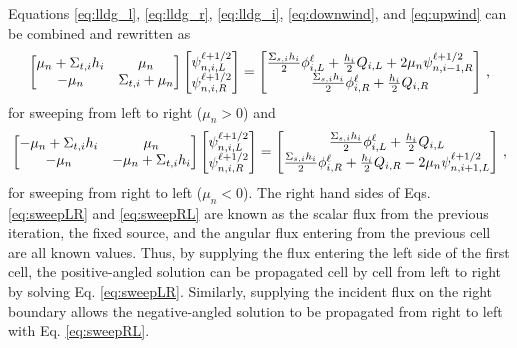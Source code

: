 Equations \ref{eq:lldg_l}, \ref{eq:lldg_r}, \ref{eq:lldg_i}, \ref{eq:downwind}, and \ref{eq:upwind} can be combined and rewritten as 
	\begin{equation} \label{eq:sweepLR}
		\left[\begin{matrix}
			\mu_n + \Sigma_{t,i} h_i & \mu_n  \\ 
			-\mu_n & \Sigma_{t,i} + \mu_n \\ 
		\end{matrix}\right]
		\left[\begin{matrix}
			\psi_{n,i,L}^{\ell+1/2} \\ \psi_{n,i,R}^{\ell+1/2}
		\end{matrix}\right]
		= \left[\begin{matrix}
			\frac{\Sigma_{s,i}h_i}{2} \phi_{i,L}^\ell + \frac{h_i}{2} Q_{i,L} + 2\mu_n \psi_{n,i-1,R}^{\ell+1/2} \\
			\frac{\Sigma_{s,i}h_i}{2} \phi_{i,R}^\ell + \frac{h_i}{2} Q_{i,R} 
		\end{matrix}\right] \,, 
	\end{equation}
for sweeping from left to right ($\mu_n > 0$) and 
	\begin{equation} \label{eq:sweepRL}
		\left[\begin{matrix} 
			-\mu_n + \Sigma_{t,i}h_i & \mu_n \\ 
			-\mu_n & -\mu_n + \Sigma_{t,i}h_i \\ 
		\end{matrix} \right]
		\left[\begin{matrix}
			\psi_{n,i,L}^{\ell+1/2} \\ \psi_{n,i,R}^{\ell+1/2}
		\end{matrix} \right]
		= \left[\begin{matrix}
			\frac{\Sigma_{s,i}h_i}{2} \phi_{i,L}^\ell + \frac{h_i}{2} Q_{i,L} \\ 
			\frac{\Sigma_{s,i}h_i}{2} \phi_{i,R}^\ell + \frac{h_i}{2} Q_{i,R} - 2\mu_n \psi_{n,i+1,L}^{\ell+1/2}
		\end{matrix} \right]
		\,, 
	\end{equation}
for sweeping from right to left ($\mu_n < 0$). The right hand sides of Eqs. \ref{eq:sweepLR} and \ref{eq:sweepRL} are known as the scalar flux from the previous iteration, the fixed source, and the angular flux entering from the previous cell are all known values. Thus, by supplying the flux entering the left side of the first cell, the positive-angled solution can be propagated cell by cell from left to right by solving Eq. \ref{eq:sweepLR}. Similarly, supplying the incident flux on the right boundary allows the negative-angled solution to be propagated from right to left with Eq. \ref{eq:sweepRL}. 

